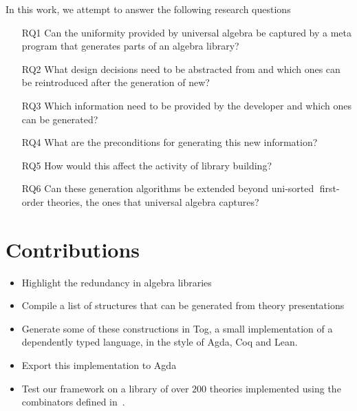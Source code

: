 
In this work, we attempt to answer the following research questions 
\begin{enumerate}
    \item[RQ1] Can the uniformity provided by universal algebra be captured by a meta program that generates parts of an algebra library?
    \item[RQ2] What design decisions need to be abstracted from and which ones can be reintroduced after the generation of new?
    \item[RQ3] Which information need to be provided by the developer and which ones can be generated? 
    \item[RQ4] What are the preconditions for generating this new information? 
    \item[RQ5] How would this affect the activity of library building?
    \item[RQ6] Can these generation algorithms be extended beyond uni-sorted first-order theories, the ones that universal algebra captures? 
\end{enumerate}

\section{Contributions}
\begin{itemize}
    \item Highlight the redundancy in algebra libraries 
    \item Compile a list of structures that can be generated from theory presentations
    \item Generate some of these constructions in Tog, a small implementation of a dependently typed language, in the style of Agda, Coq and Lean. 
    \item Export this implementation to Agda 
    \item Test our framework on a library of over $200$ theories implemented using the combinators defined in~\cite{carette2018building}. 
\end{itemize}  

